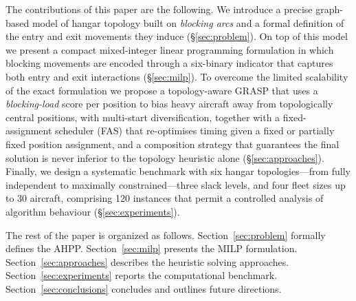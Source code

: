 The contributions of this paper are the following.  We introduce a precise
graph-based model of hangar topology built on \emph{blocking arcs} and a
formal definition of the entry and exit movements they induce
(\S\ref{sec:problem}).  On top of this model we present a compact
mixed-integer linear programming formulation in which blocking movements
are encoded through a six-binary indicator that captures both entry and
exit interactions (\S\ref{sec:milp}).  To overcome the limited scalability
of the exact formulation we propose a topology-aware GRASP that uses a
\emph{blocking-load} score per position to bias heavy aircraft away from
topologically central positions, with multi-start diversification, together
with a fixed-assignment scheduler (FAS) that re-optimises timing given a
fixed or partially fixed position assignment, and a composition strategy
that guarantees the final solution is never inferior to the topology
heuristic alone (\S\ref{sec:approaches}).  Finally, we design a systematic
benchmark with six hangar topologies---from fully independent to maximally
constrained---three slack levels, and four fleet sizes up to 30 aircraft,
comprising 120 instances that permit a controlled analysis of algorithm
behaviour (\S\ref{sec:experiments}).

The rest of the paper is organized as follows.
Section~\ref{sec:problem} formally defines the AHPP.
Section~\ref{sec:milp} presents the MILP formulation.
Section~\ref{sec:approaches} describes the heuristic solving approaches.
Section~\ref{sec:experiments} reports the computational benchmark.
Section~\ref{sec:conclusions} concludes and outlines future directions.
